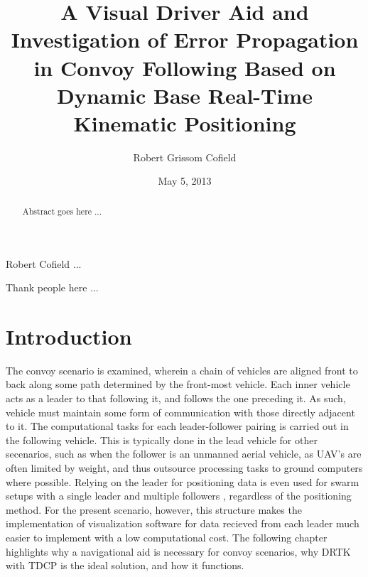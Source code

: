 \documentclass[12pt]{report}
\title{A Visual Driver Aid and Investigation of Error Propagation in Convoy Following Based on Dynamic Base Real-Time Kinematic Positioning}
\author{Robert Grissom Cofield}
\date{May 5, 2013}
\begin{document}

\begin{romanpages}

\ApprovalPage
\TitlePage
\CopyrightPage

\begin{vita}%
Robert Cofield ...
\end{vita}


\begin{abstract}
Abstract goes here ...
\end{abstract}


\begin{acknowledgments}
Thank people here ...
\end{acknowledgments}


\software{\LaTeX}
\StylePage

\tableofcontents
\listoffigures
\listoftables

\printnomenclature[0.75in] 

\end{romanpages}

\normalem       %


\chapter{Introduction}

The convoy scenario is examined, wherein a chain of vehicles are aligned front to back along some path determined by the front-most vehicle. Each inner vehicle acts as a leader to that following it, and follows the one preceding it. As such, vehicle must maintain some form of communication with those directly adjacent to it.
The computational tasks for each leader-follower pairing is carried out in the following vehicle. This is typically done in the lead vehicle for other secenarios, such as when the follower is an unmanned aerial vehicle, as UAV's are often limited by weight, and thus outsource processing tasks to ground computers where possible. Relying on the leader for positioning data is even used for swarm setups with a single leader and multiple followers \cite{gian}, regardless of the positioning method. For the present scenario, however, this structure makes the implementation of visualization software for data recieved from each leader much easier to implement with a low computational cost. The following chapter highlights why a navigational aid is necessary for convoy scenarios, why DRTK with TDCP is the ideal solution, and how it functions.
\end{document}
